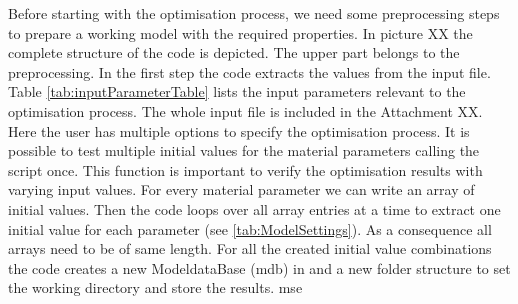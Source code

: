     Before starting with the optimisation process, we need some preprocessing steps to prepare a working  model with the required properties. In picture XX the complete structure of the code is depicted. The upper part belongs to the preprocessing. In the first step the code extracts the values from the input file. Table \autoref{tab:inputParameterTable} lists the input parameters relevant to the optimisation process. The whole input file is included in the Attachment XX. Here the user has multiple options to specify the optimisation process. It is possible to test multiple initial values for the material parameters calling the script once. This function is important to verify the optimisation results with varying input values. For every material parameter we can write an array of initial values. Then the code loops over all array entries at a time to extract one initial value for each parameter (see \autoref{tab:ModelSettings}). As a consequence all arrays need to be of same length. For all the created initial value combinations the code creates a new ModeldataBase (mdb) in  and a new folder structure to set the working directory and store the results. \acrfull{mse}
    

